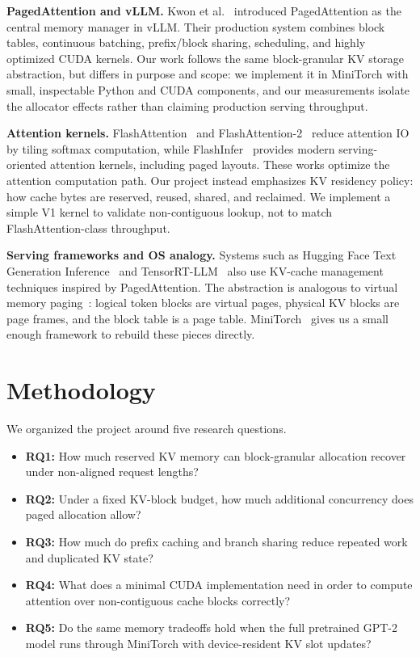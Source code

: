 \documentclass{article}
\begin{document}
\textbf{PagedAttention and vLLM.}  Kwon et al.~\cite{kwon2023efficient} introduced PagedAttention as the central memory manager in vLLM.  Their production system combines block tables, continuous batching, prefix/block sharing, scheduling, and highly optimized CUDA kernels.  Our work follows the same block-granular KV storage abstraction, but differs in purpose and scope: we implement it in MiniTorch with small, inspectable Python and CUDA components, and our measurements isolate the allocator effects rather than claiming production serving throughput.

\textbf{Attention kernels.}  FlashAttention~\cite{dao2022flashattention} and FlashAttention-2~\cite{dao2023flashattention2} reduce attention IO by tiling softmax computation, while FlashInfer~\cite{ye2025flashinfer} provides modern serving-oriented attention kernels, including paged layouts.  These works optimize the attention computation path.  Our project instead emphasizes KV residency policy: how cache bytes are reserved, reused, shared, and reclaimed.  We implement a simple V1 kernel to validate non-contiguous lookup, not to match FlashAttention-class throughput.

\textbf{Serving frameworks and OS analogy.}  Systems such as Hugging Face Text Generation Inference~\cite{huggingface2023tgi} and TensorRT-LLM~\cite{tensorrtllm2024} also use KV-cache management techniques inspired by PagedAttention.  The abstraction is analogous to virtual memory paging~\cite{silberschatz2018os}: logical token blocks are virtual pages, physical KV blocks are page frames, and the block table is a page table.  MiniTorch~\cite{rush2020minitorch} gives us a small enough framework to rebuild these pieces directly.

\section{Methodology}

We organized the project around five research questions.
\begin{itemize}
    \item \textbf{RQ1:} How much reserved KV memory can block-granular allocation recover under non-aligned request lengths?
    \item \textbf{RQ2:} Under a fixed KV-block budget, how much additional concurrency does paged allocation allow?
    \item \textbf{RQ3:} How much do prefix caching and branch sharing reduce repeated work and duplicated KV state?
    \item \textbf{RQ4:} What does a minimal CUDA implementation need in order to compute attention over non-contiguous cache blocks correctly?
    \item \textbf{RQ5:} Do the same memory tradeoffs hold when the full pretrained GPT-2 model runs through MiniTorch with device-resident KV slot updates?
\end{itemize}
\end{document}
